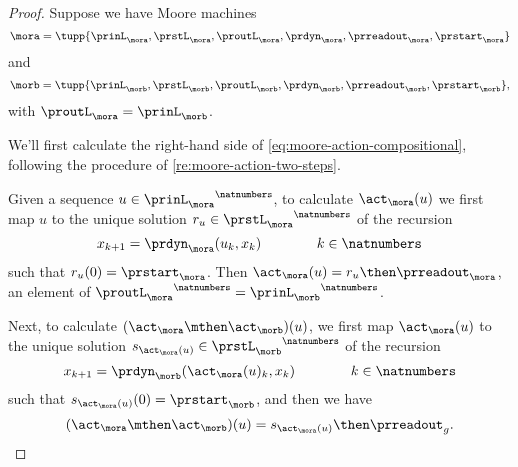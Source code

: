 \begin{proof}
    Suppose we have Moore machines
    \begin{equation}
        \mora = \tupp{\prinL_{\mora},\prstL_{\mora},\proutL_{\mora},\prdyn_{\mora},\prreadout_{\mora},\prstart_{\mora}}
    \end{equation}
    and
    \begin{equation}
        \morb = \tupp{\prinL_{\morb},\prstL_{\morb},\proutL_{\morb},\prdyn_{\morb},\prreadout_{\morb},\prstart_{\morb}},
    \end{equation}
    with $\proutL_\mora = \prinL_\morb$.

    We'll first calculate the right-hand side of \cref{eq:moore-action-compositional}, following the procedure of \cref{re:moore-action-two-steps}.

    Given a sequence $u \in {\prinL_{\mora}}^\natnumbers$, to calculate $\act_\mora(u)$ we first map $u$ to the unique solution $r_u \in {\prstL_{\mora}}^\natnumbers$ of the recursion
    \begin{equation}
        x_{k+1} = \prdyn_\mora(u_k, x_k)  \qquad \qquad k \in \natnumbers
    \end{equation}
    such that $r_u(0) = \prstart_{\mora}$.
    Then $\act_\mora(u) = r_u \then \prreadout_\mora$, an element of ${\proutL_{\mora}}^\natnumbers = {\prinL_{\morb}}^\natnumbers$.

    Next, to calculate $(\act_\mora \mthen \act_\morb)(u)$, we first map $\act_\mora(u)$ to the unique solution $s_{\act_\mora(u)} \in {\prstL_{\morb}}^\natnumbers$ of the recursion
    \begin{equation}
        x_{k+1} = \prdyn_\morb(\act_\mora(u)_k, x_k)  \qquad \qquad k \in \natnumbers
    \end{equation}
    such that $s_{\act_\mora(u)}(0) = \prstart_{\morb}$, and then we have
    \begin{equation}
        \label{eq:Moore-act-composition-1}
        (\act_\mora \mthen \act_\morb)(u) = s_{\act_\mora(u)} \then \prreadout_g.
    \end{equation}


\end{proof}
